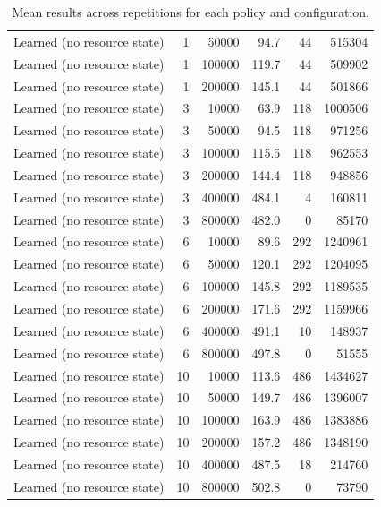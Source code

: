 \begin{table}[h]
\begin{tabular}{@{}lrrrrr@{}}
Learned (no resource state) & 1 & 50000 & 94.7 & 44 & 515304 \\
Learned (no resource state) & 1 & 100000 & 119.7 & 44 & 509902 \\
Learned (no resource state) & 1 & 200000 & 145.1 & 44 & 501866 \\
Learned (no resource state) & 3 & 10000 & 63.9 & 118 & 1000506 \\
Learned (no resource state) & 3 & 50000 & 94.5 & 118 & 971256 \\
Learned (no resource state) & 3 & 100000 & 115.5 & 118 & 962553 \\
Learned (no resource state) & 3 & 200000 & 144.4 & 118 & 948856 \\
Learned (no resource state) & 3 & 400000 & 484.1 & 4 & 160811 \\
Learned (no resource state) & 3 & 800000 & 482.0 & 0 & 85170 \\
Learned (no resource state) & 6 & 10000 & 89.6 & 292 & 1240961 \\
Learned (no resource state) & 6 & 50000 & 120.1 & 292 & 1204095 \\
Learned (no resource state) & 6 & 100000 & 145.8 & 292 & 1189535 \\
Learned (no resource state) & 6 & 200000 & 171.6 & 292 & 1159966 \\
Learned (no resource state) & 6 & 400000 & 491.1 & 10 & 148937 \\
Learned (no resource state) & 6 & 800000 & 497.8 & 0 & 51555 \\
Learned (no resource state) & 10 & 10000 & 113.6 & 486 & 1434627 \\
Learned (no resource state) & 10 & 50000 & 149.7 & 486 & 1396007 \\
Learned (no resource state) & 10 & 100000 & 163.9 & 486 & 1383886 \\
Learned (no resource state) & 10 & 200000 & 157.2 & 486 & 1348190 \\
Learned (no resource state) & 10 & 400000 & 487.5 & 18 & 214760 \\
Learned (no resource state) & 10 & 800000 & 502.8 & 0 & 73790 \\
\bottomrule
\end{tabular}
\caption{Mean results across repetitions for each policy and configuration.}
\label{tab:results}
\end{table}
